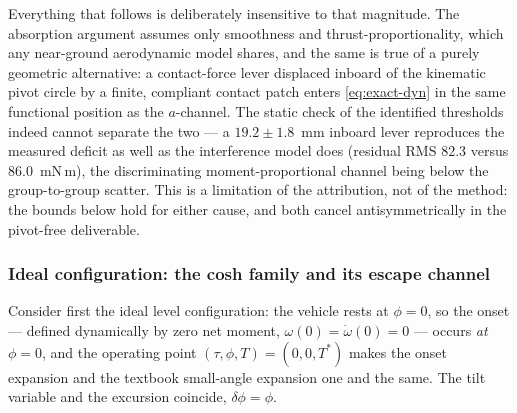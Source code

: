Everything that follows is deliberately insensitive to that magnitude.
The absorption argument assumes only smoothness and
thrust-proportionality, which any near-ground aerodynamic model
shares, and the same is true of a purely geometric alternative: a
contact-force lever displaced inboard of the kinematic pivot circle by
a finite, compliant contact patch enters \eqref{eq:exact-dyn} in the
same functional position as the $a$-channel. The static check of the
identified thresholds indeed cannot separate the two — a
$19.2 \pm 1.8$~mm inboard lever reproduces the measured deficit as
well as the interference model does (residual RMS $82.3$ versus
$86.0$~mN\,m), the discriminating moment-proportional channel being
below the group-to-group scatter. This is a limitation of the
attribution, not of the method: the bounds below hold for either
cause, and both cancel antisymmetrically in the pivot-free
deliverable.

\subsubsection{Ideal configuration: the cosh family and its escape channel}
\label{sec:fid-ideal}

Consider first the ideal level configuration: the vehicle rests at
$\phi = 0$, so the onset — defined dynamically by zero net moment,
$\omega(0)=\dot\omega(0)=0$ — occurs \emph{at} $\phi=0$, and the
operating point $(\tau,\phi,T)=(0,0,T^*)$ makes the onset expansion
and the textbook small-angle expansion one and the same. The tilt
variable and the excursion coincide, $\delta\phi = \phi$.

